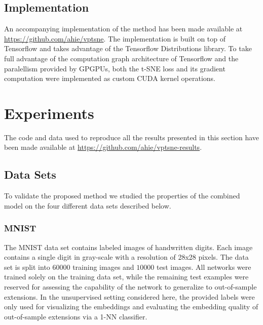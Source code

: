 \section{Implementation}
\label{section:implementation}

An accompanying implementation of the method has been made available at \url{https://github.com/ahie/vptsne}. The implementation is built on top of Tensorflow \citep{tensorflow} and takes advantage of the Tensorflow Distributions \citep{tensorflow_distributions} library. To take full advantage of the computation graph architecture of Tensorflow and the paralellism provided by GPGPUs, both the t-SNE loss and its gradient computation were implemented as custom CUDA \citep{cuda} kernel operations.


\chapter{Experiments}
\label{ch:experiments}

The code and data used to reproduce all the results presented in this section have been made available at \url{https://github.com/ahie/vptsne-results}.

\section{Data Sets}

To validate the proposed method we studied the properties of the combined model on the four different data sets described below.

\subsection{MNIST}

The MNIST data set \citep{mnist} contains labeled images of handwritten digits. Each image contains a single digit in gray-scale with a resolution of 28x28 pixels. The data set is split into $60000$ training images and $10000$ test images. All networks were trained solely on the training data set, while the remaining test examples were reserved for assessing the capability of the network to generalize to out-of-sample extensions. In the unsupervised setting considered here, the provided labels were only used for visualizing the embeddings and evaluating the embedding quality of out-of-sample extensions via a 1-NN classifier.

